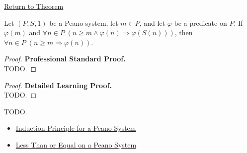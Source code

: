 \newpage
{}
\label{prf:induction-from-arbitrary-base}

\begin{remark*}[Return]
\hyperref[thm:induction-from-arbitrary-base]{Return to Theorem}
\end{remark*}

\begin{theorem*}
Let $(P,S,1)$ be a Peano system, let $m \in P$, and let $\varphi$ be a
predicate on $P$. If $\varphi(m)$ and
$\forall n \in P\;(n \ge m \land \varphi(n) \Longrightarrow \varphi(S(n)))$,
then $\forall n \in P\;(n \ge m \Longrightarrow \varphi(n))$.
\end{theorem*}

\begin{proof}
\textbf{Professional Standard Proof.}~\\
TODO.
\end{proof}

\begin{proof}
\textbf{Detailed Learning Proof.}~\\
TODO.
\end{proof}

\begin{remark*}
TODO.
\end{remark*}

\begin{dependencies}
\begin{itemize}
  \item \hyperref[thm:induction-principle-for-peano-system]{Induction Principle for a Peano System}
  \item \hyperref[def:less-than-or-equal-on-peano-system]{Less Than or Equal on a Peano System}
\end{itemize}
\end{dependencies}
